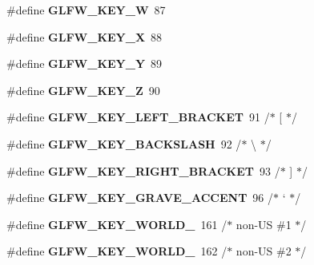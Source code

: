 \begin{DoxyCompactItemize}
\mbox{\label{group__keys_gaa06a712e6202661fc03da5bdb7b6e545}} 
\#define {\bfseries G\+L\+F\+W\+\_\+\+K\+E\+Y\+\_\+W}~87
\item 
\mbox{\label{group__keys_gac1c42c0bf4192cea713c55598b06b744}} 
\#define {\bfseries G\+L\+F\+W\+\_\+\+K\+E\+Y\+\_\+X}~88
\item 
\mbox{\label{group__keys_gafd9f115a549effdf8e372a787c360313}} 
\#define {\bfseries G\+L\+F\+W\+\_\+\+K\+E\+Y\+\_\+Y}~89
\item 
\mbox{\label{group__keys_gac489e208c26afda8d4938ed88718760a}} 
\#define {\bfseries G\+L\+F\+W\+\_\+\+K\+E\+Y\+\_\+Z}~90
\item 
\mbox{\label{group__keys_gad1c8d9adac53925276ecb1d592511d8a}} 
\#define {\bfseries G\+L\+F\+W\+\_\+\+K\+E\+Y\+\_\+\+L\+E\+F\+T\+\_\+\+B\+R\+A\+C\+K\+ET}~91  /$\ast$ \mbox{[} $\ast$/
\item 
\mbox{\label{group__keys_gab8155ea99d1ab27ff56f24f8dc73f8d1}} 
\#define {\bfseries G\+L\+F\+W\+\_\+\+K\+E\+Y\+\_\+\+B\+A\+C\+K\+S\+L\+A\+SH}~92  /$\ast$ \textbackslash{} $\ast$/
\item 
\mbox{\label{group__keys_ga86ef225fd6a66404caae71044cdd58d8}} 
\#define {\bfseries G\+L\+F\+W\+\_\+\+K\+E\+Y\+\_\+\+R\+I\+G\+H\+T\+\_\+\+B\+R\+A\+C\+K\+ET}~93  /$\ast$ \mbox{]} $\ast$/
\item 
\mbox{\label{group__keys_ga7a3701fb4e2a0b136ff4b568c3c8d668}} 
\#define {\bfseries G\+L\+F\+W\+\_\+\+K\+E\+Y\+\_\+\+G\+R\+A\+V\+E\+\_\+\+A\+C\+C\+E\+NT}~96  /$\ast$ ` $\ast$/
\item 
\mbox{\label{group__keys_gadc78dad3dab76bcd4b5c20114052577a}} 
\#define {\bfseries G\+L\+F\+W\+\_\+\+K\+E\+Y\+\_\+\+W\+O\+R\+L\+D\+\_}~161 /$\ast$ non-\/US \#1 $\ast$/
\item 
\mbox{\label{group__keys_ga20494bfebf0bb4fc9503afca18ab2c5e}} 
\#define {\bfseries G\+L\+F\+W\+\_\+\+K\+E\+Y\+\_\+\+W\+O\+R\+L\+D\+\_}~162 /$\ast$ non-\/US \#2 $\ast$/
\item 

\end{DoxyCompactItemize}
